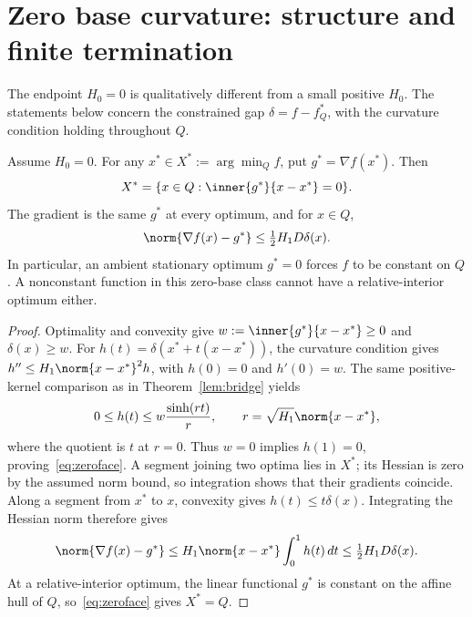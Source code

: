 \section{Zero base curvature: structure and finite termination}
\label{sec:zero}
The endpoint $H_0=0$ is qualitatively different from a small positive
$H_0$. The statements below concern the constrained gap
$\delta=f-f_Q^*$, with the curvature condition holding throughout $Q$.

\begin{proposition}
\label{prop:zeroface}
Assume $H_0=0$. For any $x^*\in X^*:=\arg\min_Q f$, put
$g^*=\nabla f(x^*)$. Then
\begin{equation}\label{eq:zeroface}
 X^*=\{x\in Q:\inner{g^*}{x-x^*}=0\}.
\end{equation}
The gradient is the same $g^*$ at every optimum, and for $x\in Q$,
\begin{equation}\label{eq:zerograd}
 \norm{\nabla f(x)-g^*}\le\tfrac12H_1D\delta(x).
\end{equation}
In particular, an ambient stationary optimum $g^*=0$ forces $f$
to be constant on $Q$. A nonconstant function in this zero-base
class cannot have a relative-interior optimum either.
\end{proposition}
\begin{proof}
Optimality and convexity give $w:=\inner{g^*}{x-x^*}\ge0$ and
$\delta(x)\ge w$. For $h(t)=\delta(x^*+t(x-x^*))$, the
curvature condition gives $h''\le H_1\norm{x-x^*}^2h$,
with $h(0)=0$ and $h'(0)=w$. The same positive-kernel comparison
as in Theorem~\ref{lem:bridge} yields
\[
 0\le h(t)\le w\frac{\sinh(rt)}r,\qquad
 r=\sqrt{H_1}\norm{x-x^*},
\]
where the quotient is $t$ at $r=0$. Thus $w=0$ implies
$h(1)=0$, proving~\eqref{eq:zeroface}. A segment joining two
optima lies in $X^*$; its Hessian is zero by the assumed norm
bound, so integration shows that their gradients coincide.
Along a segment from $x^*$ to $x$, convexity gives $h(t)\le t\delta(x)$.
Integrating the Hessian norm therefore gives
\[
 \norm{\nabla f(x)-g^*}
 \le H_1\norm{x-x^*}\int_0^1h(t)\,dt
 \le\tfrac12H_1D\delta(x).
\]
At a relative-interior optimum, the linear functional $g^*$ is
constant on the affine hull of $Q$, so~\eqref{eq:zeroface} gives
$X^*=Q$.
\end{proof}


